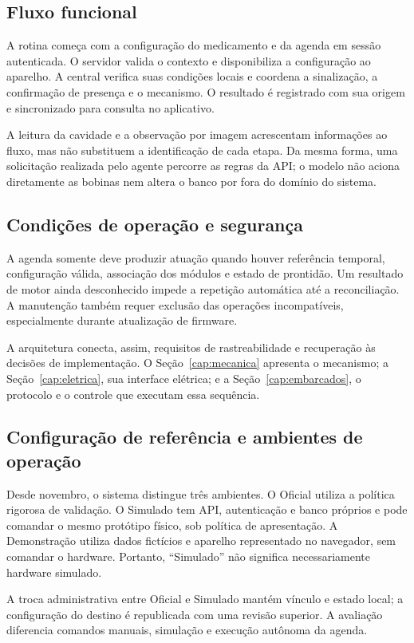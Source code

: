 \subsection{Fluxo funcional}
A rotina começa com a configuração do medicamento e da agenda em sessão autenticada. O servidor valida o contexto e disponibiliza a configuração ao aparelho. A central verifica suas condições locais e coordena a sinalização, a confirmação de presença e o mecanismo. O resultado é registrado com sua origem e sincronizado para consulta no aplicativo.

A leitura da cavidade e a observação por imagem acrescentam informações ao fluxo, mas não substituem a identificação de cada etapa. Da mesma forma, uma solicitação realizada pelo agente percorre as regras da API; o modelo não aciona diretamente as bobinas nem altera o banco por fora do domínio do sistema.

\subsection{Condições de operação e segurança}
A agenda somente deve produzir atuação quando houver referência temporal, configuração válida, associação dos módulos e estado de prontidão. Um resultado de motor ainda desconhecido impede a repetição automática até a reconciliação. A manutenção também requer exclusão das operações incompatíveis, especialmente durante atualização de firmware.

A arquitetura conecta, assim, requisitos de rastreabilidade e recuperação às decisões de implementação. O Seção~\ref{cap:mecanica} apresenta o mecanismo; a Seção~\ref{cap:eletrica}, sua interface elétrica; e a Seção~\ref{cap:embarcados}, o protocolo e o controle que executam essa sequência.

\subsection{Configuração de referência e ambientes de operação}
Desde novembro, o sistema distingue três ambientes. O Oficial utiliza a política rigorosa de validação. O Simulado tem API, autenticação e banco próprios e pode comandar o mesmo protótipo físico, sob política de apresentação. A Demonstração utiliza dados fictícios e aparelho representado no navegador, sem comandar o hardware. Portanto, ``Simulado'' não significa necessariamente hardware simulado. 

A troca administrativa entre Oficial e Simulado mantém vínculo e estado local; a configuração do destino é republicada com uma revisão superior. A avaliação diferencia comandos manuais, simulação e execução autônoma da agenda. 

